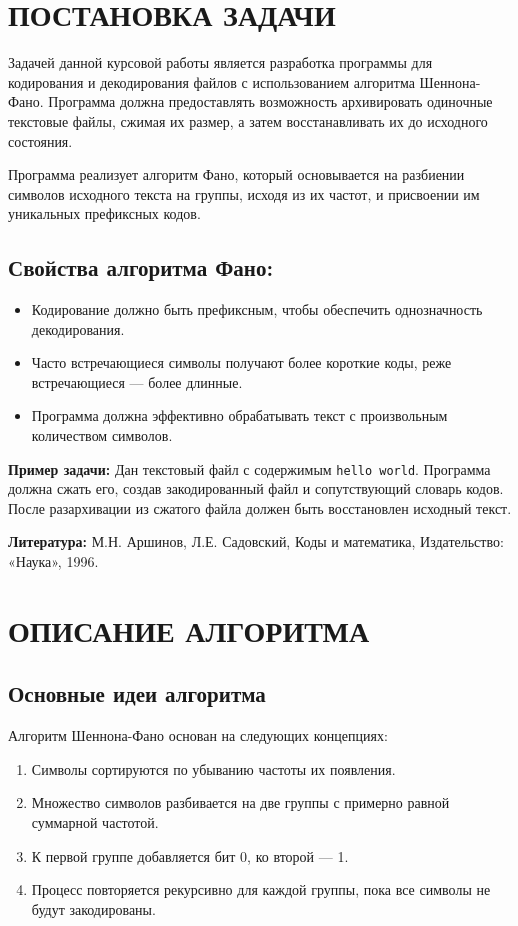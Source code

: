 \documentclass[12pt]{article}
\begin{document}
\tableofcontents
\newpage

\section{\textbf{ПОСТАНОВКА ЗАДАЧИ}}
Задачей данной курсовой работы является разработка программы для кодирования и декодирования файлов с использованием алгоритма Шеннона-Фано. Программа должна предоставлять возможность архивировать одиночные текстовые файлы, сжимая их размер, а затем восстанавливать их до исходного состояния.

Программа реализует алгоритм Фано, который основывается на разбиении символов исходного текста на группы, исходя из их частот, и присвоении им уникальных префиксных кодов.

\subsection*{Свойства алгоритма Фано:}
\begin{itemize}
    \item Кодирование должно быть префиксным, чтобы обеспечить однозначность декодирования.
    \item Часто встречающиеся символы получают более короткие коды, реже встречающиеся — более длинные.
    \item Программа должна эффективно обрабатывать текст с произвольным количеством символов.
\end{itemize}

\textbf{Пример задачи:} Дан текстовый файл с содержимым \texttt{hello world}. Программа должна сжать его, создав закодированный файл и сопутствующий словарь кодов. После разархивации из сжатого файла должен быть восстановлен исходный текст.

\textbf{Литература:} М.Н. Аршинов, Л.Е. Садовский, Коды и математика, Издательство: «Наука», 1996.

\newpage
\section{\textbf{ОПИСАНИЕ АЛГОРИТМА}}
\subsection{Основные идеи алгоритма}
Алгоритм Шеннона-Фано основан на следующих концепциях:
\begin{enumerate}
    \item Символы сортируются по убыванию частоты их появления.
    \item Множество символов разбивается на две группы с примерно равной суммарной частотой.
    \item К первой группе добавляется бит 0, ко второй — 1.
    \item Процесс повторяется рекурсивно для каждой группы, пока все символы не будут закодированы.
\end{enumerate}
\end{document}
